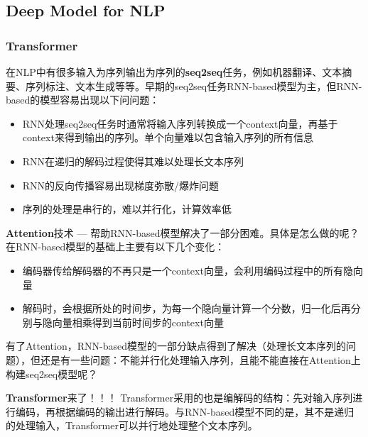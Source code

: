 \subsection{Deep Model for NLP}

\subsubsection{Transformer}
在NLP中有很多输入为序列输出为序列的\textbf{seq2seq}任务，例如机器翻译、文本摘要、序列标注、文本生成等等。早期的seq2seq任务RNN-based\cite{sutskever2014sequence, cho2014learning}模型为主，但RNN-based的模型容易出现以下问问题：
\begin{itemize}
	\item RNN处理seq2seq任务时通常将输入序列转换成一个context向量，再基于context来得到输出的序列。单个向量难以包含输入序列的所有信息
	\item RNN在递归的解码过程使得其难以处理长文本序列
	\item RNN的反向传播容易出现梯度弥散/爆炸问题
	\item 序列的处理是串行的，难以并行化，计算效率低
\end{itemize}
\textbf{Attention}\cite{bahdanau2016neural, luong2015effective}技术 --- 帮助RNN-based模型解决了一部分困难。具体是怎么做的呢？在RNN-based模型的基础上主要有以下几个变化：
\begin{itemize}
	\item 编码器传给解码器的不再只是一个context向量，会利用编码过程中的所有隐向量
	\item 解码时，会根据所处的时间步，为每一个隐向量计算一个分数，归一化后再分别与隐向量相乘得到当前时间步的context向量
\end{itemize}

有了Attention，RNN-based模型的一部分缺点得到了解决（处理长文本序列的问题），但还是有一些问题：不能并行化处理输入序列，且能不能直接在Attention上构建seq2seq模型呢？

\textbf{Transformer}\cite{vaswani2017attention}来了！！！
Transformer采用的也是编解码的结构：先对输入序列进行编码，再根据编码的输出进行解码。与RNN-based模型不同的是，其不是递归的处理输入，Transformer可以并行地处理整个文本序列。 

